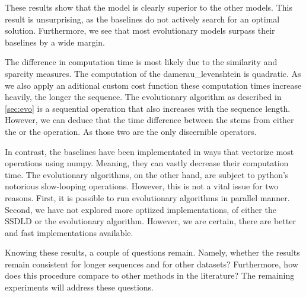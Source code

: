 \documentclass[./../../paper.tex]{subfiles}
\begin{document}
These results show that the model  is clearly superior to the other models. This result is unsurprising, as the baselines do not actively search for an optimal solution. Furthermore, we see that most evolutionary models surpass their baselines by a wide margin. 

The difference in computation time is most likely due to the similarity and sparcity measures. The computation of the \gls{damerau_levenshtein} is quadratic. As we also apply an aditional custom cost function these computation times increase heavily, the longer the sequence. The evolutionary algorithm as described in \autoref{sec:evo} is a sequential operation that also increases with the sequence length. However, we can deduce that the time difference between the  stems from either the  or the  operation. As those two are the only discernible operators. 

In contrast, the baselines have been implementated in ways that vectorize most operations using numpy. Meaning, they can vastly decrease their computation time. The evolutionary algorithms, on the other hand, are subject to python's notorious slow-looping operations. However, this is not a vital issue for two reasons. First, it is possible to run evolutionary algorithms in parallel manner. Second, we have not explored more optiized implementations, of either the \gls{SSDLD} or the evolutionary algorithm. However, we are certain, there are better and fast implementations available. 

Knowing these results, a couple of questions remain. Namely, whether the results remain consistent for longer sequences and for other datasets? Furthermore, how does this procedure compare to other methods in the literature? The remaining experiments will address these questions. 
\end{document}

